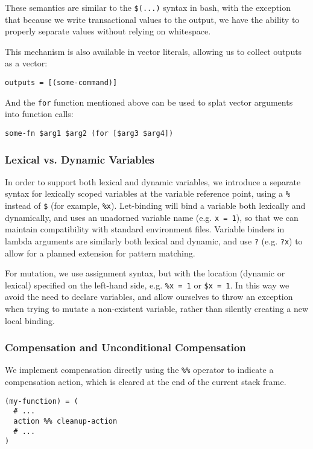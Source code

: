 \documentclass[english,preprint,JIP,uplatex]{ipsj}
\begin{document}
\noindent
These semantics are similar to the \verb/$(...)/ syntax in bash, with the exception that because we write transactional values to the output, we have the ability to properly separate values without relying on whitespace.

This mechanism is also available in vector literals, allowing us to collect outputs as a vector:
\begin{lstlisting}
outputs = [(some-command)]
\end{lstlisting}
\noindent
And the \verb/for/ function mentioned above can be used to splat vector arguments into function calls:
\begin{lstlisting}
some-fn $arg1 $arg2 (for [$arg3 $arg4])
\end{lstlisting}

\subsubsection{Lexical vs. Dynamic Variables}\noindent
In order to support both lexical and dynamic variables, we introduce a separate syntax for lexically scoped variables at the variable reference point, using a \verb/%/ instead of \verb/$/ (for example, \verb/%x/). Let-binding will bind a variable both lexically and dynamically, and uses an unadorned variable name (e.g. \verb/x = 1/), so that we can maintain compatibility with standard environment files. Variable binders in lambda arguments are similarly both lexical and dynamic, and use \verb/?/ (e.g. \verb/?x/) to allow for a planned extension for pattern matching.

For mutation, we use assignment syntax, but with the location (dynamic or lexical) specified on the left-hand side, e.g. \verb/%x = 1/ or \verb/$x = 1/. In this way we avoid the need to declare variables, and allow ourselves to throw an exception when trying to mutate a non-existent variable, rather than silently creating a new local binding.

\subsubsection{Compensation and Unconditional Compensation}\noindent
We implement compensation directly using the \verb/%%/ operator to indicate a compensation action, which is cleared at the end of the current stack frame.
\begin{lstlisting}
(my-function) = (
  # ...
  action %% cleanup-action
  # ...
)
\end{lstlisting}
\end{document}

